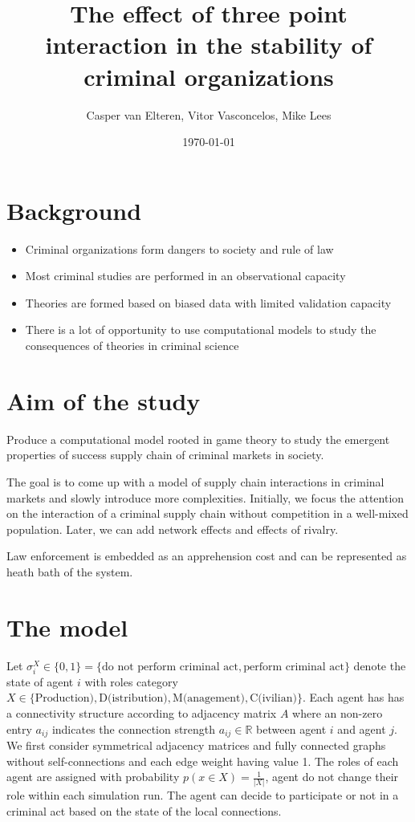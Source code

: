 \documentclass[a4paper, 11pt, twocolumn]{article}
\author{Casper van Elteren, Vitor Vasconcelos, Mike Lees}
\date{\today}
\title{The effect of three point interaction in the stability of criminal organizations}
\begin{document}
\maketitle
\tableofcontents


\section{Background}
\label{sec:orgd28b8e4}
\begin{itemize}
\item Criminal organizations form dangers to society and rule of law
\item Most criminal studies are performed in an observational capacity
\item Theories  are formed  based  on biased  data with  limited
validation capacity
\item There is a lot of  opportunity to use computational models
to study the consequences of theories in criminal science
\end{itemize}

\section{Aim of the study}
\label{sec:orge5801de}
Produce a computational model rooted in game theory to study
the  emergent  properties  of   success  supply  chain  of
criminal markets in society.

The  goal  is to  come  up  with  a  model of  supply  chain
interactions in  criminal markets and slowly  introduce more
complexities.  Initially,  we  focus the  attention  on  the
interaction of  a criminal supply chain  without competition
in  a  well-mixed  population.  Later, we  can  add  network
effects and effects of rivalry.

Law enforcement is  embedded as an apprehension  cost and can
be represented as heath bath of the system.


\section{The model}
\label{sec:org9d1612b}
Let \(\sigma_i^X \in \{ 0, 1  \} = \{\textrm{do not perform criminal
act}, \textrm{perform criminal act}  \}\) denote the state of
agent \(i\) with roles  category \(X \in \{ \textrm{Production)},
\textrm{D(istribution)},              \textrm{M(anagement)},
\textrm{C(ivilian)}\}\).  Each agent  has has  a connectivity
structure  according  to  adjacency   matrix  \(A\)  where  an
non-zero  entry \(a_{ij}\)  indicates the  connection strength
\(a_{ij}  \in \mathbb{R}\)  between agent  \(i\)  and agent  \(j\). We  first
consider symmetrical adjacency  matrices and fully connected
graphs without self-connections and  each edge weight having
value  1.  The  roles  of   each  agent  are  assigned  with
probability \(p(x  \in X)  = \frac{1}  {| X  |}\), agent  do not
change their role within each  simulation run. The agent can
decide to participate or not in  a criminal act based on the
state of the local connections.
\end{document}
